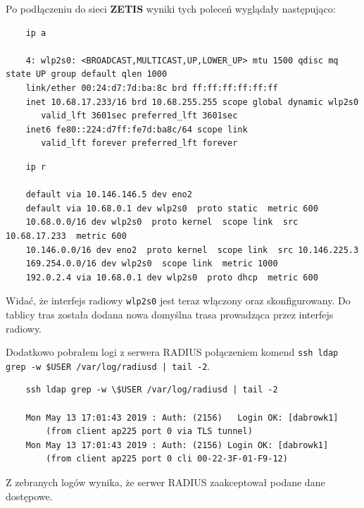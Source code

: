 \documentclass{mwart} %
\begin{document}
Po podłączeniu do sieci \textbf{ZETIS} wyniki tych poleceń wyglądały następująco:
\begin{verbatim}
    ip a

    4: wlp2s0: <BROADCAST,MULTICAST,UP,LOWER_UP> mtu 1500 qdisc mq state UP group default qlen 1000
    link/ether 00:24:d7:7d:ba:8c brd ff:ff:ff:ff:ff:ff
    inet 10.68.17.233/16 brd 10.68.255.255 scope global dynamic wlp2s0
       valid_lft 3601sec preferred_lft 3601sec
    inet6 fe80::224:d7ff:fe7d:ba8c/64 scope link 
       valid_lft forever preferred_lft forever
\end{verbatim}

\begin{verbatim}
    ip r 

    default via 10.146.146.5 dev eno2 
    default via 10.68.0.1 dev wlp2s0  proto static  metric 600 
    10.68.0.0/16 dev wlp2s0  proto kernel  scope link  src 10.68.17.233  metric 600 
    10.146.0.0/16 dev eno2  proto kernel  scope link  src 10.146.225.3 
    169.254.0.0/16 dev wlp2s0  scope link  metric 1000 
    192.0.2.4 via 10.68.0.1 dev wlp2s0  proto dhcp  metric 600 
\end{verbatim}

Widać, że interfejs radiowy \texttt{wlp2s0} jest teraz włączony oraz skonfigurowany.
Do tablicy tras została dodana nowa domyślna trasa prowadząca przez interfejs radiowy.
\vspace{5 mm}

Dodatkowo pobrałem logi z serwera RADIUS połączeniem komend \texttt{ssh ldap grep -w \$USER /var/log/radiusd | tail -2}.
\begin{verbatim}
    ssh ldap grep -w \$USER /var/log/radiusd | tail -2

    Mon May 13 17:01:43 2019 : Auth: (2156)   Login OK: [dabrowk1] 
        (from client ap225 port 0 via TLS tunnel)
    Mon May 13 17:01:43 2019 : Auth: (2156) Login OK: [dabrowk1]
        (from client ap225 port 0 cli 00-22-3F-01-F9-12)
\end{verbatim}
Z zebranych logów wynika, że serwer RADIUS zaakceptował podane dane dostępowe.
\end{document}
